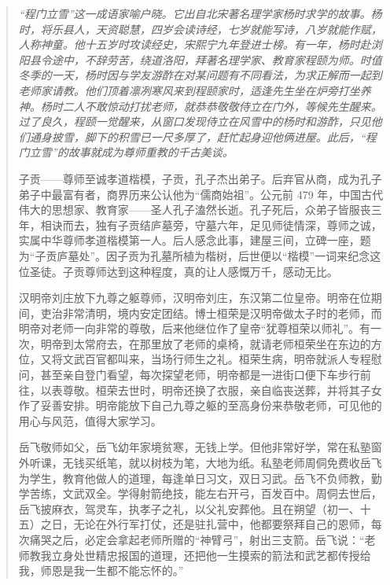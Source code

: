 \begin{quotation}\it
    “程门立雪”这一成语家喻户晓。它出自北宋著名理学家杨时求学的故事。杨时，将乐县人，天资聪慧，四岁会读诗经，七岁就能写诗，八岁就能作赋，人称神童。他十五岁时攻读经史，宋熙宁九年登进士榜。有一年，杨时赴浏阳县令途中，不辞劳苦，绕道洛阳，拜著名理学家、教育家程颐为师。时值冬季的一天，杨时因与学友游酢在对某问题有不同看法，为求正解而一起到老师家请教。他们顶着凛冽寒风来到程颐家时，适逢先生坐在炉旁打坐养神。杨时二人不敢惊动打扰老师，就恭恭敬敬侍立在门外，等候先生醒来。过了良久，程颐一觉醒来，从窗口发现侍立在风雪中的杨时和游酢，只见他们通身披雪，脚下的积雪已一尺多厚了，赶忙起身迎他俩进屋。此后，“程门立雪”的故事就成为尊师重教的千古美谈。

    子贡——尊师至诚孝道楷模，子贡，孔子杰出弟子。后弃官从商，成为孔子弟子中最富有者，商界历来公认他为“儒商始祖”。公元前 479 年，中国古代伟大的思想家、教育家——圣人孔子溘然长逝。孔子死后，众弟子皆服丧三年，相诀而去，独有子贡结庐墓旁，守墓六年，足见师徒情深，尊师之诚，实属中华尊师孝道楷模第一人。后人感念此事，建屋三间，立碑一座，题为“子贡庐墓处”。因子贡为孔墓所植为楷树，后世便以“楷模”一词来纪念这位圣徒。子贡尊师达到这种程度，真的让人感慨万千，感动无比。

    汉明帝刘庄放下九尊之躯尊师，汉明帝刘庄，东汉第二位皇帝。明帝在位期间，吏治非常清明，境内安定团结。博士桓荣是汉明帝做太子时的老师，而明帝对老师一向非常的尊敬，后来他继位作了皇帝“犹尊桓荣以师礼”。有一次，明帝到太常府去，在那里放了老师的桌椅，就请老师桓荣坐在东边的方位，又将文武百官都叫来，当场行师生之礼。桓荣生病，明帝就派人专程慰问，甚至亲自登门看望，每次探望老师，明帝都是一进街口便下车步行前往，以表尊敬。桓荣去世时，明帝还换了衣服，亲自临丧送葬，并将其子女作了妥善安排。明帝能放下自己九尊之躯的至高身份来恭敬老师，可见他的用心与风范，值得大家学习。

    岳飞敬师如父，岳飞幼年家境贫寒，无钱上学。但他非常好学，常在私塾窗外听课，无钱买纸笔，就以树枝为笔，大地为纸。私塾老师周侗免费收岳飞为学生，教育他做人的道理，每逢单日习文，双日习武。岳飞不负师教，勤学苦练，文武双全。学得射箭绝技，能左右开弓，百发百中。周侗去世后，岳飞披麻衣，驾灵车，执孝子之礼，以父礼安葬他。且在朔望（初一、十五）之日，无论在外行军打仗，还是驻扎营中，他都要祭拜自己的恩师，每次痛哭之后，必定会拿起老师所赠的“神臂弓”，射出三支箭。岳飞说：“老师教我立身处世精忠报国的道理，还把他一生摸索的箭法和武艺都传授给我，师恩是我一生都不能忘怀的。”
\end{quotation}

